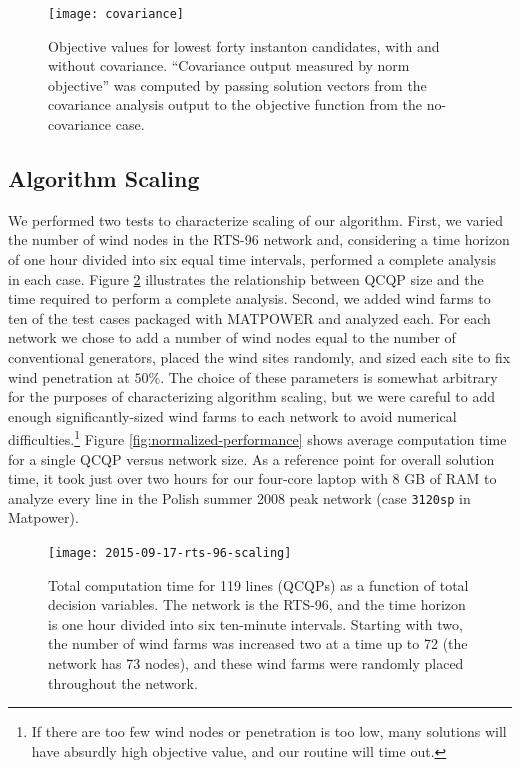 \documentclass[journal,twoside]{IEEEtran}
\begin{document}
\begin{figure}
\centering
\texttt{[image: covariance]}
\caption{Objective values for lowest forty instanton candidates, with and without covariance. ``Covariance output measured by norm objective'' was computed by passing solution vectors from the covariance analysis output to the objective function from the no-covariance case.}
\label{fig:covariance}
\end{figure}

\subsection{Algorithm Scaling}
We performed two tests to characterize scaling of our algorithm. First, we varied the number of wind nodes in the RTS-96 network and, considering a time horizon of one hour divided into six equal time intervals, performed a complete analysis in each case. Figure \ref{fig:rts-96-scaling} illustrates the relationship between QCQP size and the time required to perform a complete analysis. Second, we added wind farms to ten of the test cases packaged with MATPOWER \cite{zimmerman2011} and analyzed each. For each network we chose to add a number of wind nodes equal to the number of conventional generators, placed the wind sites randomly, and sized each site to fix wind penetration at $50\%$. The choice of these parameters is somewhat arbitrary for the purposes of characterizing algorithm scaling, but we were careful to add enough significantly-sized wind farms to each network to avoid numerical difficulties.\footnote{If there are too few wind nodes or penetration is too low, many solutions will have absurdly high objective value, and our routine will time out.} Figure \ref{fig:normalized-performance} shows average computation time for a single QCQP versus network size. As a reference point for overall solution time, it took just over two hours for our four-core laptop with 8 GB of RAM to analyze every line in the Polish summer 2008 peak network (case \texttt{3120sp} in Matpower).

\begin{figure}
\centering
\texttt{[image: 2015-09-17-rts-96-scaling]}
\caption{Total computation time for 119 lines (QCQPs) as a function of total decision variables. The network is the RTS-96, and the time horizon is one hour divided into six ten-minute intervals. Starting with two, the number of wind farms was increased two at a time up to 72 (the network has 73 nodes), and these wind farms were randomly placed throughout the network.}
\label{fig:rts-96-scaling}
\end{figure}
\end{document}
